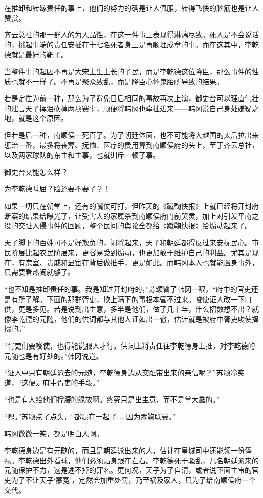 在推卸和转嫁责任的事上，他们的努力的确是让人佩服，转得飞快的脑筋也是让人赞赏。

齐云总社的那一群人的为人品性，在这一件事上表现得淋漓尽致。死人是不会说话的，挑起事端的责任安插在十七名死者身上是再顺理成章的事。而在这其中，李乾德就是最好的靶子。

当整件事的起因不再是大宋土生土长的子民，而是李乾德这位降臣，那么事件的性质也就不一样了。不再是聚众致乱，而是降臣心怀鬼胎所导致的结果。

若是定性为前一种，那么为了避免日后相同的事故再次上演，御史台可以理直气壮的建言天子挥泪砍掉两项赛事，顺便将韩冈也牵扯进来——韩冈说自己身处嫌疑之地，就是这个原因。

但若是后一种，南顺侯一死百了。为了朝廷体面，也不可能将大越国的太后拉出来惩治一番，最多将丧葬、抚恤、医疗的费用算到南顺侯府的头上，至于齐云总社，以及两家球队的东主和主事，也就训斥一顿了事。

御史台又能怎么样？

为李乾德叫屈？脸还要不要了？！

如果一切只在朝堂上，还有的嘴仗可打，但昨天的《蹴鞠快报》上就已经将开封府断案的结果给曝光了，让受害人的家属杀到南顺侯府门前哭灵，加上对引发平南之役的交趾入侵事件的回顾，整个民间的舆论全都给《蹴鞠快报》给煽动起来了。

天子脚下的百姓可不是好欺负的，闹将起来，天子和朝廷都得反过来安抚民心。市民阶层比起农民阶层来，更容易受到煽动，也更加敢于维护自己的利益。尤其是现在，有宗室、贵戚和显宦在背后做推手，更是如此。而韩冈本人也就能置身事外，只需要看热闹就够了。

“也不知是推卸责任的事。我是知过开封府的，”苏颂瞥了韩冈一眼，“府中的官吏还是有所了解。下面的那群胥吏，欺上瞒下的事根本管不过来。唆使证人改一下口供，更是多见。若是说到出主意，多半是他们，做了几十年，什么招数想不出？就像李乾德的元随，他们的供词都与其他人证如出一辙，估计就是被府中胥吏唆使撺掇的。”

“胥吏们要唆使，也得能说服人才行。供词上将责任往李乾德身上推，对李乾德的元随也是有好处的。”韩冈说道。

“证人中只有朝廷派去的元随，李乾德身边从交趾带出来的亲信呢？”苏颂冷笑道，“这便是府中胥吏的手段。”

“也是有人给他们撑腰的缘故啊。终究只是出主意，而不是掌大纛的。”

“嗯。”苏颂点了点头，“都混在一起了……因为蹴鞠联赛。”

韩冈微微一笑，都是明白人啊。

李乾德身边是有元随的，而且是朝廷派出来的人，估计在皇城司中还能领一份俸禄。李乾德出外看球，他们必须贴身跟在左右。李乾德死于骚乱，几名朝廷派来的元随保护不力，这是逃不掉的罪名。更何况，天子为了自清，或者说下面主审的官吏为了不让天子‘蒙冤’，定然会加重处罚，乃至祸及家人，只为了给南顺侯府一个交代。

